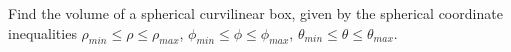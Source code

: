 \begin{frame}
\begin{example}
Find the volume of a spherical curvilinear box, given by the spherical coordinate inequalities $\rho_{min}\leq \rho \leq \rho_{max}$, $\phi_{min}\leq \phi\leq \phi_{max}$, $\theta_{min}\leq \theta\leq \theta_{max} $.
\end{example}
\end{frame}